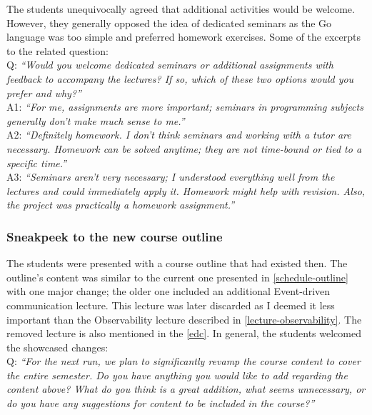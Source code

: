 \documentclass[
  digital,
  color,
  oneside,
  nosansbold,
  nocolorbold,
  nolof,
  nolot,
]{fithesis4}
\begin{document}
The students unequivocally agreed that additional activities would be welcome. However, they generally opposed the idea of dedicated seminars as the Go language was too simple and preferred homework exercises. Some of the excerpts to the related question: \\

\noindent
Q: \textit{\enquote{Would you welcome dedicated seminars or additional assignments with feedback to accompany the lectures? If so, which of these two options would you prefer and why?}} \\

\noindent
A1: \textit{\enquote{For me, assignments are more important; seminars in programming subjects generally don't make much sense to me.}} \\

\noindent
A2: \textit{\enquote{Definitely homework. I don't think seminars and working with a tutor are necessary. Homework can be solved anytime; they are not time-bound or tied to a specific time.}} \\

\noindent
A3: \textit{\enquote{Seminars aren't very necessary; I understood everything well from the lectures and could immediately apply it. Homework might help with revision. Also, the project was practically a homework assignment.}} \\

\subsubsection{Sneakpeek to the new course outline}\label{sneakpeek}

\noindent
The students were presented with a course outline that had existed then. The outline's content was similar to the current one presented in \cref{schedule-outline} with one major change; the older one included an additional Event-driven communication lecture. This lecture was later discarded as I deemed it less important than the Observability lecture described in \cref{lecture-observability}. The removed lecture is also mentioned in the \cref{edc}. In general, the students welcomed the showcased changes: \\

\noindent
Q: \textit{\enquote{For the next run, we plan to significantly revamp the course content to cover the entire semester. Do you have anything you would like to add regarding the content above? What do you think is a great addition, what seems unnecessary, or do you have any suggestions for content to be included in the course?}} \\
\end{document}
